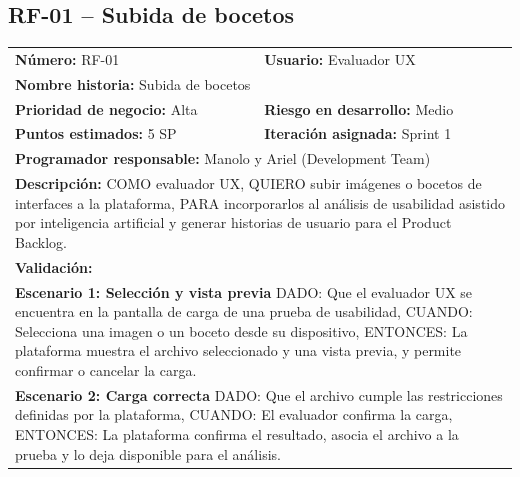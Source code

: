 \documentclass[12pt,a4paper]{article}
\begin{document}
\subsection{RF-01 -- Subida de bocetos}

\vspace{0.5cm}
\begin{longtable}{|p{}|p{}|}
\hline
\rowcolor{gray!20}
\multicolumn{2}{|l|}{\textbf{Historia de Usuario: RF-01 -- Subida de bocetos}} \\ \hline
\textbf{Número:} RF-01 & \textbf{Usuario:} Evaluador UX \\ \hline
\multicolumn{2}{|l|}{\textbf{Nombre historia:} Subida de bocetos} \\ \hline
\textbf{Prioridad de negocio:} Alta & \textbf{Riesgo en desarrollo:} Medio \\ \hline
\textbf{Puntos estimados:} 5 SP & \textbf{Iteración asignada:} Sprint 1 \\ \hline
\multicolumn{2}{|l|}{\textbf{Programador responsable:} Manolo y Ariel (Development Team)} \\ \hline
\multicolumn{2}{|p{0.9\textwidth}|}{
\textbf{Descripción:}\newline
COMO evaluador UX,\newline
QUIERO subir imágenes o bocetos de interfaces a la plataforma,\newline
PARA incorporarlos al análisis de usabilidad asistido por inteligencia artificial y generar historias de usuario para el Product Backlog.
} \\ \hline
\multicolumn{2}{|l|}{\textbf{Validación:}} \\ \hline
\multicolumn{2}{|p{0.9\textwidth}|}{
\textbf{Escenario 1: Selección y vista previa}\newline
DADO: Que el evaluador UX se encuentra en la pantalla de carga de una prueba de usabilidad,\newline
CUANDO: Selecciona una imagen o un boceto desde su dispositivo,\newline
ENTONCES: La plataforma muestra el archivo seleccionado y una vista previa, y permite confirmar o cancelar la carga.
} \\ \hline
\multicolumn{2}{|p{0.9\textwidth}|}{
\textbf{Escenario 2: Carga correcta}\newline
DADO: Que el archivo cumple las restricciones definidas por la plataforma,\newline
CUANDO: El evaluador confirma la carga,\newline
ENTONCES: La plataforma confirma el resultado, asocia el archivo a la prueba y lo deja disponible para el análisis.
} \\ \hline
\end{longtable}
\vspace{0.5cm}
\end{document}
